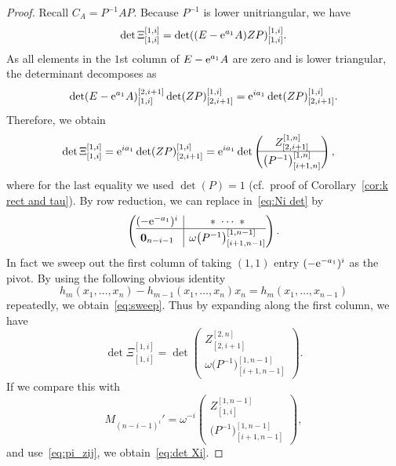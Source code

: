 \documentclass[10pt,a4paper]{amsart}
\numberwithin{equation}{section}
\newcommand{\bm}[1]{\mbox{\boldmath{$#1$}}}
\theoremstyle{definition}
\begin{document}
\begin{proof}
Recall $C_A=P^{-1}AP$.
Because $P^{-1}$ is lower unitriangular, we have
\[
\det\Xi^{[1,i]}_{[1,i]}
=
\det((E-{\rm e}^{a_1}A)ZP)_{[1,i]}^{[1,i]}.
\]
As all elements in the $1$st column of $E-{\rm e}^{a_1}A$ are zero and  is lower triangular, the determinant  decomposes as
\[
\det(E-{\rm e}^{a_1}A)^{[2,i+1]}_{[1,i]}\det(ZP)_{[2,i+1]}^{[1,i]}
={\rm e}^{ia_1}\det(ZP)_{[2,i+1]}^{[1,i]}.
\]
Therefore, we obtain
\begin{align}
\det\Xi^{[1,i]}_{[1,i]}
&={\rm e}^{ia_1}\det(ZP)_{[2,i+1]}^{[1,i]}
={\rm e}^{ia_1}\det\left(
\begin{matrix}
Z_{[2,i+1]}^{[1,n]} \\\hline
\bigl(P^{-1}\bigr)_{[i+1,n]}^{[1,n]}
\end{matrix}
\right), \label{eq:Ni det}
\end{align}
where for the last equality we used $\det(P)=1$ (cf.\ proof of Corollary~\ref{cor:k rect and tau}).
By row reduction, we can replace  in~\eqref{eq:Ni det} by
\begin{equation}
\left(
\begin{array}{@{}c|c@{}}
 (-{\rm e}^{-a_1})^{i} &\ast\ \cdots\ \ast \\\hline
 \bm{0}_{n-i-1} & \omega\bigl(P^{-1}\bigr)_{[i+1,n-1]}^{[1,n-1]}
\end{array}
\right).
\label{eq:sweep}
\end{equation}
In fact we sweep out the first column of  taking $(1,1)$ entry $(-{\rm e}^{-a_1})^i$ as
the pivot. By using the following obvious identity
\[
h_m(x_1,\dots,x_n)-h_{m-1}(x_1,\dots,x_n)x_n=h_{m}(x_1,\dots,x_{n-1})
\] repeatedly, we obtain~\eqref{eq:sweep}.
Thus by expanding along the first column, we have
\[
\det\Xi^{[1,i]}_{[1,i]}=
\det\left(
\begin{matrix}
Z_{[2,i+1]}^{[2,n]} \\\hline
\omega\bigl(P^{-1}\bigr)_{[i+1,n-1]}^{[1,n-1]}
\end{matrix}
\right).
\]
If we compare this with
\[M_{(n-i-1)^i}'=
\omega^{-i} \left(
\begin{matrix}
Z^{[1,n-1]}_{[1,i]}\\
\hline
\bigl(P^{-1}\bigr)^{[1,n-1]}_{[i+1,n-1]}
\end{matrix}
\right),
\]
and use~\eqref{eq:pi_zij},
we obtain~\eqref{eq:det Xi}.
\end{proof}
\end{document}
